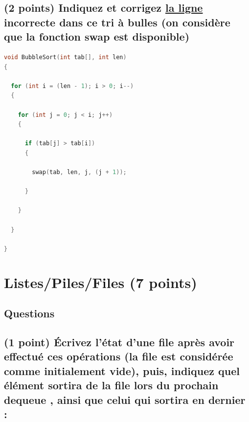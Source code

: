\documentclass[11pt,a4paper]{article}
\begin{document}
\subsection{(2 points) Indiquez et corrigez \underline{la ligne} incorrecte dans ce tri à bulles (on considère que la fonction \og swap \fg{} est disponible) }

\bigskip



\begin{lstlisting}[language=C,commentstyle=\color{commentgreen}]
void BubbleSort(int tab[], int len)
{

  for (int i = (len - 1); i > 0; i--)
  {

    for (int j = 0; j < i; j++)
    {

      if (tab[j] > tab[i])
      {

        swap(tab, len, j, (j + 1));

      }

    }

  }

}
\end{lstlisting}


\clearpage


\section{Listes/Piles/Files (7 points)}

\subsection*{Questions}

\subsection{(1 point) \'Ecrivez l'état d'une file après avoir effectué ces opérations (la file est considérée comme initialement vide), puis, indiquez quel élément sortira de la file lors du prochain \og dequeue \fg{}, ainsi que celui qui sortira en dernier : }
\end{document}

